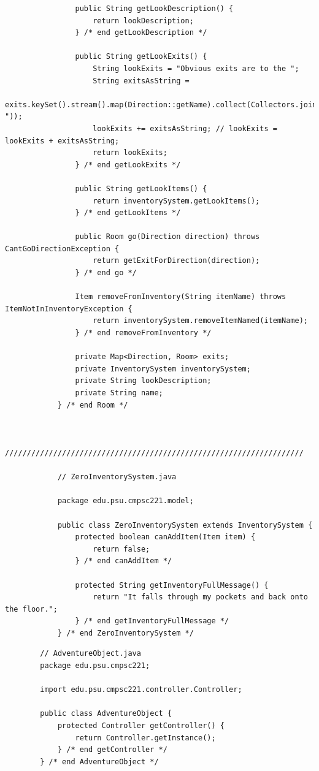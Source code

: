 \documentclass[a4paper, 11pt]{article}
\begin{document}
\begin{lstlisting}
                public String getLookDescription() {
                    return lookDescription;
                } /* end getLookDescription */

                public String getLookExits() {
                    String lookExits = "Obvious exits are to the ";
                    String exitsAsString =
                       exits.keySet().stream().map(Direction::getName).collect(Collectors.joining(", "));
                    lookExits += exitsAsString; // lookExits = lookExits + exitsAsString;
                    return lookExits;
                } /* end getLookExits */

                public String getLookItems() {
                    return inventorySystem.getLookItems();
                } /* end getLookItems */

                public Room go(Direction direction) throws CantGoDirectionException {
                    return getExitForDirection(direction);
                } /* end go */

                Item removeFromInventory(String itemName) throws ItemNotInInventoryException {
                    return inventorySystem.removeItemNamed(itemName);
                } /* end removeFromInventory */

                private Map<Direction, Room> exits;
                private InventorySystem inventorySystem;
                private String lookDescription;
                private String name;
            } /* end Room */


            ////////////////////////////////////////////////////////////////////

            // ZeroInventorySystem.java

            package edu.psu.cmpsc221.model;

            public class ZeroInventorySystem extends InventorySystem {
                protected boolean canAddItem(Item item) {
                    return false;
                } /* end canAddItem */

                protected String getInventoryFullMessage() {
                    return "It falls through my pockets and back onto the floor.";
                } /* end getInventoryFullMessage */
            } /* end ZeroInventorySystem */
            \end{lstlisting}

        \newpage

        \begin{lstlisting}
        // AdventureObject.java
        package edu.psu.cmpsc221;

        import edu.psu.cmpsc221.controller.Controller;

        public class AdventureObject {
            protected Controller getController() {
                return Controller.getInstance();
            } /* end getController */
        } /* end AdventureObject */
        \end{lstlisting}
\end{document}

